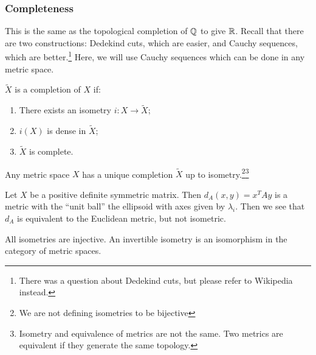 \documentclass[10pt, twoside]{article}
\begin{document}
    \subsubsection{Completeness} This is the same as the topological completion
    of $\mathbb{Q}$ to give $\mathbb{R}$. Recall that there are two constructions: Dedekind
    cuts, which are easier, and Cauchy sequences, which are
    better.\footnote{There was a question about Dedekind cuts, but please refer
    to Wikipedia instead.} Here, we will use Cauchy sequences which can be done
    in any metric space.

    \begin{defn} $\tilde{X}$ is a completion of $X$ if: \begin{enumerate} \item
    There exists an isometry $i: X \rightarrow \tilde{X}$; \item $i(X)$ is
    dense in $\tilde{X}$; \item $\tilde{X}$ is complete.  \end{enumerate}
\end{defn}

    \begin{thm} Any metric space $X$ has a unique completion $\tilde{X}$ up to
        isometry.\footnote{We are not defining isometries to be
        bijective}\footnote{Isometry and equivalence of metrics are not the
    same. Two metrics are equivalent if they generate the same topology.}
\end{thm}

    \begin{exm} Let $X$ be a positive definite
        symmetric matrix. Then $d_A(x,y) = x^TAy$ is a metric with the ``unit
        ball'' the ellipsoid with axes given by $\lambda_i$. Then we see that
        $d_A$ is equivalent to the Euclidean metric, but not isometric.
    \end{exm}

    \begin{rmk} All isometries are injective. An invertible isometry is an
    isomorphism in the category of metric spaces.  \end{rmk}
\end{document}
